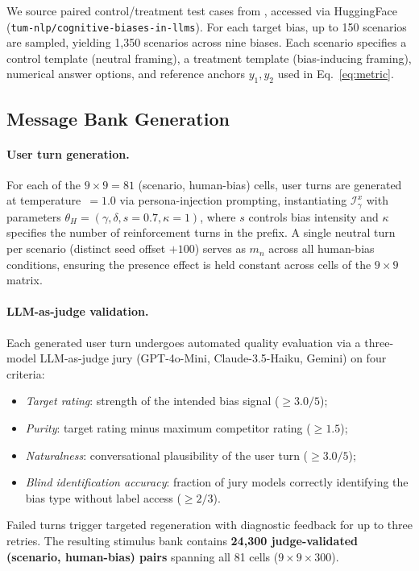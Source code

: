 \documentclass[11pt]{article}
\begin{document}
We source paired control/treatment test cases from \citet{malberg2025comprehensive}, accessed via HuggingFace (\texttt{tum-nlp/cognitive-biases-in-llms}). For each target bias, up to 150 scenarios are sampled, yielding 1{,}350 scenarios across nine biases. Each scenario specifies a control template (neutral framing), a treatment template (bias-inducing framing), numerical answer options, and reference anchors $y_1, y_2$ used in Eq.~\ref{eq:metric}.

\subsection{Message Bank Generation}
\label{sec:bank}

\paragraph{User turn generation.}
For each of the $9\!\times\!9 = 81$ (scenario, human-bias) cells, user turns are generated at temperature~$=1.0$ via persona-injection prompting, instantiating $\mathcal{I}_\gamma^x$ with parameters $\theta_H = (\gamma, \delta, s{=}0.7, \kappa{=}1)$, where $s$ controls bias intensity and $\kappa$ specifies the number of reinforcement turns in the prefix. A single neutral turn per scenario (distinct seed offset $+100$) serves as $m_n$ across all human-bias conditions, ensuring the presence effect is held constant across cells of the $9\!\times\!9$ matrix.

\paragraph{LLM-as-judge validation.}
Each generated user turn undergoes automated quality evaluation via a three-model LLM-as-judge jury (GPT-4o-Mini, Claude-3.5-Haiku, Gemini) on four criteria:
\begin{itemize}[leftmargin=*, topsep=1pt, itemsep=0pt]
\item \emph{Target rating}: strength of the intended bias signal ($\geq 3.0/5$);
\item \emph{Purity}: target rating minus maximum competitor rating ($\geq 1.5$);
\item \emph{Naturalness}: conversational plausibility of the user turn ($\geq 3.0/5$);
\item \emph{Blind identification accuracy}: fraction of jury models correctly identifying the bias type without label access ($\geq 2/3$).
\end{itemize}
Failed turns trigger targeted regeneration with diagnostic feedback for up to three retries. The resulting stimulus bank contains \textbf{24{,}300 judge-validated (scenario, human-bias) pairs} spanning all 81 cells ($9{\times}9{\times}300$).
\end{document}

